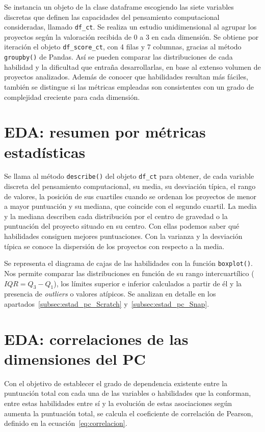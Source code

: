 \documentclass[a4paper, 12pt]{book}
\begin{document}
Se instancia un objeto de la clase dataframe escogiendo las siete variables discretas que definen las capacidades del pensamiento computacional consideradas, llamado \texttt{df\_ct}. Se realiza un estudio unidimensional al agrupar los proyectos según la valoración recibida de 0 a 3 en cada dimensión. Se obtiene por iteración el objeto \texttt{df\_score\_ct}, con 4 filas y 7 columnas, gracias al método \texttt{groupby()} de Pandas. Así se pueden comparar las distribuciones de cada habilidad y la dificultad que entraña desarrollarlas, en base al extenso volumen de proyectos analizados. Además de conocer que habilidades resultan más fáciles, también se distingue si las métricas empleadas son consistentes con un grado de complejidad creciente para cada dimensión.

\section{EDA: resumen por métricas estadísticas} 
\label{sec:EDA_estadísticos}

Se llama al método \texttt{describe()} del objeto \texttt{df\_ct} para obtener, de cada variable discreta del pensamiento computacional, su media, su desviación típica, el rango de valores, la posición de sus cuartiles cuando se ordenan los proyectos de menor a mayor puntuación y su mediana, que coincide con el segundo cuartil. La media y la mediana describen cada distribución por el centro de gravedad o la puntuación del proyecto situado en su centro. Con ellas podemos saber qué habilidades consiguen mejores puntuaciones. Con la varianza y la desviación típica se conoce la dispersión de los proyectos con respecto a la media. 

Se representa el diagrama de cajas de las habilidades con la función \texttt{boxplot()}. Nos permite comparar las distribuciones en función de su rango intercuartílico ($IQR=Q_3 - Q_1$), los límites superior e inferior calculados a partir de él y la presencia de \emph{outliers} o valores atípicos. Se analizan en detalle en los apartados~\ref{subsec:estad_pc_Scratch} y~\ref{subsec:estad_pc_Snap}.   

\section{EDA: correlaciones de las dimensiones del PC} 
\label{sec:EDA_corr}

Con el objetivo de establecer el grado de dependencia existente entre la puntuación total con cada una de las variables o habilidades que la conforman, entre estas habilidades entre sí y la evolución de estas asociaciones según aumenta la puntuación total, se calcula el coeficiente de correlación de Pearson, definido en la ecuación~\ref{eq:correlacion}. 
\end{document}

